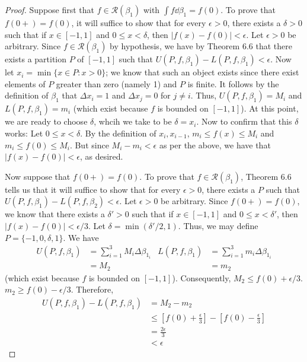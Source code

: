 \documentclass[../psets.tex]{subfiles}
\begin{document}
\begin{enumerate}[label={\textbf{\arabic*.}}]
\begin{enumerate}
\begin{proof}
            Suppose first that $f\in\mathscr{R}(\beta_1)$ with $\int f\dd{\beta_1}=f(0)$. To prove that $f(0+)=f(0)$, it will suffice to show that for every $\epsilon>0$, there exists a $\delta>0$ such that if $x\in[-1,1]$ and $0\leq x<\delta$, then $|f(x)-f(0)|<\epsilon$. Let $\epsilon>0$ be arbitrary. Since $f\in\mathscr{R}(\beta_1)$ by hypothesis, we have by Theorem 6.6 that there exists a partition $P$ of $[-1,1]$ such that $U(P,f,\beta_1)-L(P,f,\beta_1)<\epsilon$. Now let $x_i=\min\{x\in P:x>0\}$; we know that such an object exists since there exist elements of $P$ greater than zero (namely 1) and $P$ is finite. It follows by the definition of $\beta_1$ that $\Delta x_i=1$ and $\Delta x_j=0$ for $j\neq i$. Thus, $U(P,f,\beta_1)=M_i$ and $L(P,f,\beta_1)=m_i$ (which exist because $f$ is bounded on $[-1,1]$). At this point, we are ready to choose $\delta$, whcih we take to be $\delta=x_i$. Now to confirm that this $\delta$ works: Let $0\leq x<\delta$. By the definition of $x_i,x_{i-1}$, $m_i\leq f(x)\leq M_i$ and $m_i\leq f(0)\leq M_i$. But since $M_i-m_i<\epsilon$ as per the above, we have that $|f(x)-f(0)|<\epsilon$, as desired.\par\medskip
            Now suppose that $f(0+)=f(0)$. To prove that $f\in\mathscr{R}(\beta_1)$, Theorem 6.6 tells us that it will suffice to show that for every $\epsilon>0$, there exists a $P$ such that $U(P,f,\beta_1)-L(P,f,\beta_2)<\epsilon$. Let $\epsilon>0$ be arbitrary. Since $f(0+)=f(0)$, we know that there exists a $\delta'>0$ such that if $x\in[-1,1]$ and $0\leq x<\delta'$, then $|f(x)-f(0)|<\epsilon/3$. Let $\delta=\min(\delta'/2,1)$. Thus, we may define $P=\{-1,0,\delta,1\}$. We have
            \begin{align*}
                U(P,f,\beta_1) &= \sum_{i=1}^3M_i\Delta\beta_{1_i}&
                    L(P,f,\beta_1) &= \sum_{i=1}^3m_i\Delta\beta_{1_i}\\
                &= M_2&
                    &= m_2
            \end{align*}
            (which exist because $f$ is bounded on $[-1,1]$). Consequently, $M_2\leq f(0)+\epsilon/3$. $m_2\geq f(0)-\epsilon/3$. Therefore,
            \begin{align*}
                U(P,f,\beta_1)-L(P,f,\beta_1) &= M_2-m_2\\
                &\leq [f(0)+\tfrac{\epsilon}{3}]-[f(0)-\tfrac{\epsilon}{3}]\\
                &= \frac{2\epsilon}{3}\\
                &< \epsilon
            \end{align*}

\end{proof}
\end{enumerate}
\end{enumerate}
\end{document}
